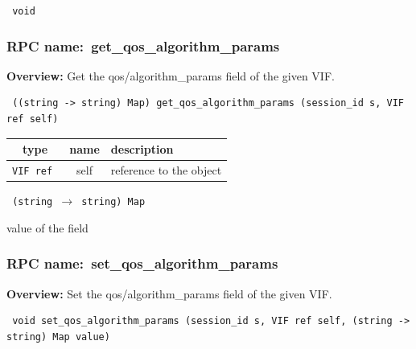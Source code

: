 \vspace{0.3cm}

{\tt 
void
}



\vspace{0.3cm}
\vspace{0.3cm}
\vspace{0.3cm}
\subsubsection{RPC name:~get\_qos\_algorithm\_params}

{\bf Overview:} 
Get the qos/algorithm\_params field of the given VIF.

\begin{verbatim} ((string -> string) Map) get_qos_algorithm_params (session_id s, VIF ref self)\end{verbatim}



 
\vspace{0.3cm}
\begin{tabular}{|c|c|p{7cm}|}
 \hline
{\bf type} & {\bf name} & {\bf description} \\ \hline
{\tt VIF ref } & self & reference to the object \\ \hline 

\end{tabular}

\vspace{0.3cm}

{\tt 
(string $\rightarrow$ string) Map
}


value of the field
\vspace{0.3cm}
\vspace{0.3cm}
\vspace{0.3cm}
\subsubsection{RPC name:~set\_qos\_algorithm\_params}

{\bf Overview:} 
Set the qos/algorithm\_params field of the given VIF.

\begin{verbatim} void set_qos_algorithm_params (session_id s, VIF ref self, (string -> string) Map value)\end{verbatim}



